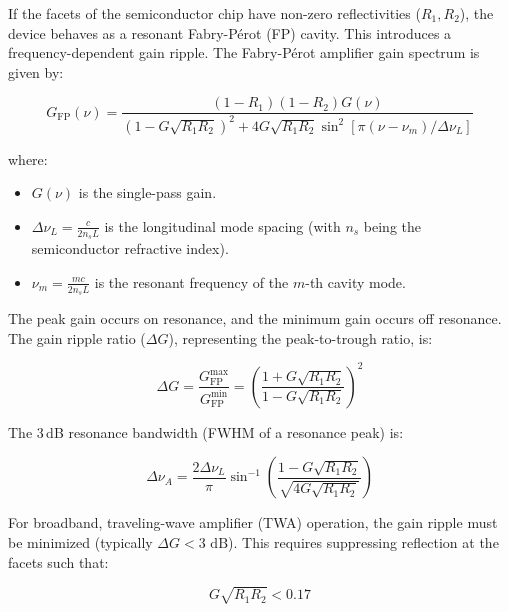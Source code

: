 If the facets of the semiconductor chip have non-zero reflectivities ($R_1, R_2$), the device behaves as a resonant Fabry-Pérot (FP) cavity. This introduces a frequency-dependent gain ripple. The Fabry-Pérot amplifier gain spectrum is given by:
\begin{keyresult}
    \begin{equation}
        G_\text{FP}(\nu) = \frac{(1-R_1)(1-R_2)G(\nu)}{\left(1 - G\sqrt{R_1 R_2}\right)^2 + 4G\sqrt{R_1 R_2}\sin^2\!\left[\pi(\nu - \nu_m)/\Delta\nu_L\right]}
    \end{equation}
\end{keyresult}
where:
\begin{itemize}
    \item $G(\nu)$ is the single-pass gain.
    \item $\Delta\nu_L = \frac{c}{2n_s L}$ is the longitudinal mode spacing (with $n_s$ being the semiconductor refractive index).
    \item $\nu_m = \frac{mc}{2n_s L}$ is the resonant frequency of the $m$-th cavity mode.
\end{itemize}

The peak gain occurs on resonance, and the minimum gain occurs off resonance. The gain ripple ratio ($\Delta G$), representing the peak-to-trough ratio, is:
\begin{keyresult}
    \begin{equation}
        \Delta G = \frac{G_\text{FP}^\text{max}}{G_\text{FP}^\text{min}} = \left(\frac{1 + G\sqrt{R_1 R_2}}{1 - G\sqrt{R_1 R_2}}\right)^2
    \end{equation}
\end{keyresult}

The 3\,dB resonance bandwidth (FWHM of a resonance peak) is:
\begin{keyresult}
    \begin{equation}
        \Delta\nu_A = \frac{2\Delta\nu_L}{\pi}\sin^{-1}\!\left( \frac{1 - G\sqrt{R_1 R_2}}{\sqrt{4 G\sqrt{R_1 R_2}}} \right)
    \end{equation}
\end{keyresult}

For broadband, traveling-wave amplifier (TWA) operation, the gain ripple must be minimized (typically $\Delta G < 3\text{ dB}$). This requires suppressing reflection at the facets such that:
\begin{keyresult}
    \begin{equation}
        G\sqrt{R_1 R_2} < 0.17
    \end{equation}
\end{keyresult}

